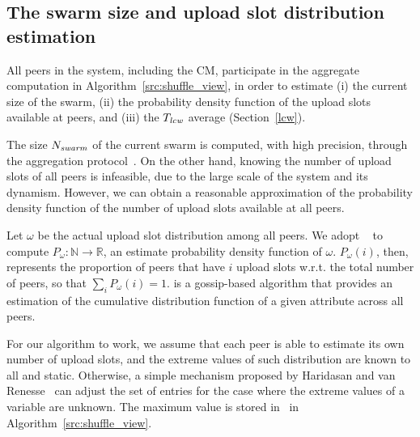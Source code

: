 \subsection{The swarm size and upload slot distribution estimation}

All peers in the system, including the CM, participate in the aggregate computation
in Algorithm~\ref{src:shuffle_view}, in order to
estimate (i) the current size of
the swarm, (ii) the probability density function of the upload slots available
at peers, and (iii) the $T_{\mathit{lcw}}$ average (Section~\ref{lcw}).

The size $N_{\mathit{swarm}}$ of the current swarm is computed, with high precision,
through the aggregation protocol~\cite{aggregation}. On the other hand, knowing the
number of upload slots of all peers is infeasible, due to the large scale of
the system and its dynamism. However, we can obtain a reasonable approximation
of the probability density function of the number of upload slots available at
all peers.

Let $\omega$ be the actual upload slot distribution among all peers. We
adopt \adam~\cite{adam2} to compute $P_{\omega}: \mathbb{N} \rightarrow
\mathbb{R}$, an estimate probability density function of $\omega$.
$P_{\omega}(i)$, then, represents the proportion of peers that have $i$ upload
slots w.r.t. the total number of peers, so that $\sum_i P_{\omega}(i) = 1$.
\adam is a gossip-based algorithm that provides an estimation of the
cumulative distribution function of a given attribute across all peers.

For our algorithm to work, we assume that each peer is able to estimate its
own number of upload slots, and the extreme values of such distribution are
known to all and static. Otherwise, a simple mechanism proposed by Haridasan
and van Renesse~\cite{gossipestimation} can adjust the set of entries for the
case where the extreme values of a variable are unknown. The maximum value is
stored in \maxslot\ in Algorithm~\ref{src:shuffle_view}.

